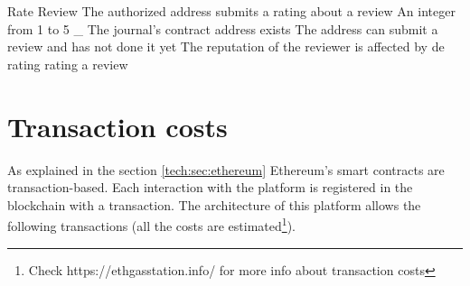 {Rate Review}%
{The authorized address submits a rating about a review}%
{An integer from 1 to 5}%
{_}%
{The journal's contract address exists}%
{The address can submit a review and has not done it yet}%
{The reputation of the reviewer is affected by de rating}%
{rating a review}%
\section{Transaction costs}
\label{arch:trans}

As explained in the section \ref{tech:sec:ethereum} Ethereum's smart contracts
are transaction-based. Each interaction with the platform is registered in the
blockchain with a transaction. The architecture of this platform allows the
following transactions (all the costs are estimated\footnote{Check
  https://ethgasstation.info/ for more info about transaction costs}).

